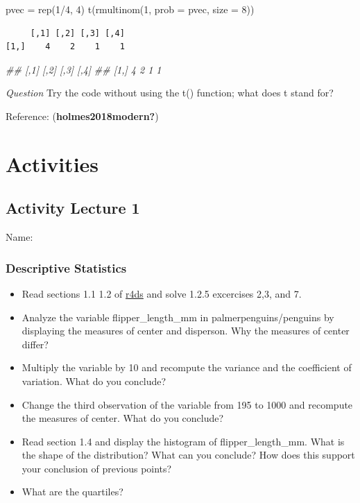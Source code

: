 \documentclass[
  letterpaper,
  DIV=11,
  numbers=noendperiod]{scrreprt}
\newenvironment{Shaded}{\begin{snugshade}}{\end{snugshade}}
\newcommand{\AttributeTok}[1]{\textcolor[rgb]{0.40,0.45,0.13}{#1}}
\newcommand{\DecValTok}[1]{\textcolor[rgb]{0.68,0.00,0.00}{#1}}
\newcommand{\DocumentationTok}[1]{\textcolor[rgb]{0.37,0.37,0.37}{\textit{#1}}}
\newcommand{\FunctionTok}[1]{\textcolor[rgb]{0.28,0.35,0.67}{#1}}
\newcommand{\NormalTok}[1]{\textcolor[rgb]{0.00,0.23,0.31}{#1}}
\newcommand{\OtherTok}[1]{\textcolor[rgb]{0.00,0.23,0.31}{#1}}
\newcommand{\SpecialCharTok}[1]{\textcolor[rgb]{0.37,0.37,0.37}{#1}}
\begin{document}
\begin{Shaded}
\begin{Highlighting}[]
\NormalTok{pvec }\OtherTok{=} \FunctionTok{rep}\NormalTok{(}\DecValTok{1}\SpecialCharTok{/}\DecValTok{4}\NormalTok{, }\DecValTok{4}\NormalTok{)}
\FunctionTok{t}\NormalTok{(}\FunctionTok{rmultinom}\NormalTok{(}\DecValTok{1}\NormalTok{, }\AttributeTok{prob =}\NormalTok{ pvec, }\AttributeTok{size =} \DecValTok{8}\NormalTok{))}
\end{Highlighting}
\end{Shaded}

\begin{verbatim}
     [,1] [,2] [,3] [,4]
[1,]    4    2    1    1
\end{verbatim}

\begin{Shaded}
\begin{Highlighting}[]
\DocumentationTok{\#\#      [,1] [,2] [,3] [,4]}
\DocumentationTok{\#\# [1,]    4    2    1    1}
\end{Highlighting}
\end{Shaded}

\emph{Question} Try the code without using the t() function; what does t
stand for?

Reference: (\textbf{holmes2018modern?})

\part{Activities}

\chapter{Activity Lecture 1}\label{sec-week1}

Name:

\section{Descriptive Statistics}\label{descriptive-statistics}

\begin{itemize}
\item
  Read sections 1.1 1.2 of
  \href{https://r4ds.hadley.nz/data-visualize.html}{r4ds} and solve
  1.2.5 excercises 2,3, and 7.
\item
  Analyze the variable flipper\_length\_mm in palmerpenguins/penguins by
  displaying the measures of center and disperson. Why the measures of
  center differ?
\item
  Multiply the variable by 10 and recompute the variance and the
  coefficient of variation. What do you conclude?
\item
  Change the third observation of the variable from 195 to 1000 and
  recompute the measures of center. What do you conclude?
\item
  Read section 1.4 and display the histogram of flipper\_length\_mm.
  What is the shape of the distribution? What can you conclude? How does
  this support your conclusion of previous points?
\item
  What are the quartiles?
\end{itemize}
\end{document}
